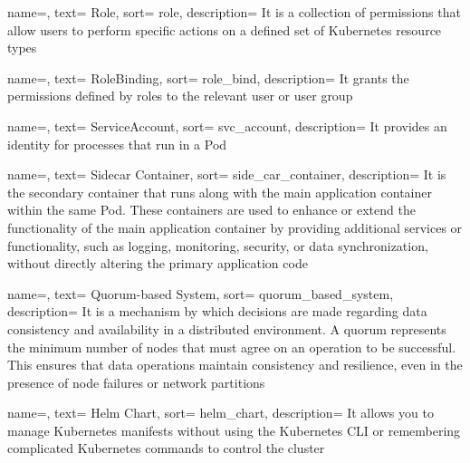 {
  name=,
  text= Role,
  sort= role,
  description= {It is a collection of permissions that allow users to perform specific actions on a defined set of Kubernetes resource types}
}

{
  name=,
  text= RoleBinding,
  sort= role_bind,
  description= {It grants the permissions defined by roles to the relevant user or user group}
}

{
  name=,
  text= ServiceAccount,
  sort= svc_account,
  description= {It provides an identity for processes that run in a Pod}
}

{
  name=,
  text= Sidecar Container,
  sort= side_car_container,
  description= {It is the secondary container that runs along with the main application container within the same Pod. These containers are used to enhance or extend the functionality of the main application container by providing additional services or functionality, such as logging, monitoring, security, or data synchronization, without directly altering the primary application code}
}

{
  name=,
  text= Quorum-based System,
  sort= quorum_based_system,
  description= {It is a mechanism by which decisions are made regarding data consistency and availability in a distributed environment. A quorum represents the minimum number of nodes that must agree on an operation to be successful. This ensures that data operations maintain consistency and resilience, even in the presence of node failures or network partitions}
}

{
  name=,
  text= Helm Chart,
  sort= helm_chart,
  description= {It allows you to manage Kubernetes manifests without using the Kubernetes \acrshort{CLI} or remembering complicated Kubernetes commands to control the cluster}
}